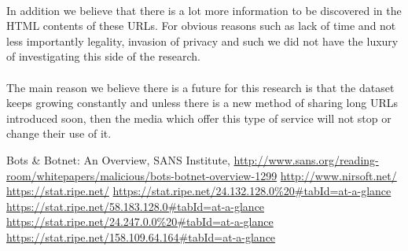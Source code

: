 \documentclass[12pt]{article}
\begin{document}
\paragraph{}
In addition we believe that there is a lot more information to be discovered in the HTML contents of these URLs. For obvious reasons such as lack of time and not less importantly legality, invasion of privacy and such we did not have the luxury of investigating this side of the research. 

\paragraph{}
The main reason we believe there is a future for this research is that the dataset keeps growing constantly and unless there is a new method of sharing long URLs introduced soon, then the media which offer this type of service will not stop or change their use of it.
\newpage

\begin{thebibliography}{99}

Bots \& Botnet: An Overview, SANS Institute, \url{http://www.sans.org/reading-room/whitepapers/malicious/bots-botnet-overview-1299}
\url{http://www.nirsoft.net/}
\url{https://stat.ripe.net/}
\url{https://stat.ripe.net/24.132.128.0%20#tabId=at-a-glance}
\url{https://stat.ripe.net/58.183.128.0#tabId=at-a-glance}
\url{https://stat.ripe.net/24.247.0.0%20#tabId=at-a-glance}
\url{https://stat.ripe.net/158.109.64.164#tabId=at-a-glance}

\end{thebibliography}
\end{document}
